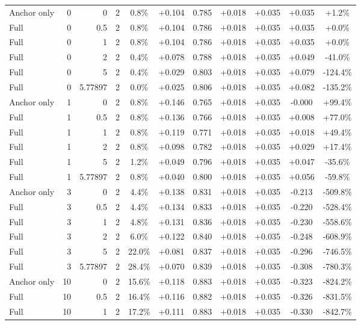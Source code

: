 \begin{table}[htbp]
\begin{tabular}{lrrrccccccc}
Anchor only & 0 & 0 & 2 & 0.8\% & +0.104 & 0.785 & +0.018 & +0.035 & +0.035 & +1.2\% \\
Full & 0 & 0.5 & 2 & 0.8\% & +0.104 & 0.786 & +0.018 & +0.035 & +0.035 & +0.0\% \\
Full & 0 & 1 & 2 & 0.8\% & +0.104 & 0.786 & +0.018 & +0.035 & +0.035 & +0.0\% \\
Full & 0 & 2 & 2 & 0.4\% & +0.078 & 0.788 & +0.018 & +0.035 & +0.049 & -41.0\% \\
Full & 0 & 5 & 2 & 0.4\% & +0.029 & 0.803 & +0.018 & +0.035 & +0.079 & -124.4\% \\
Full & 0 & 5.77897 & 2 & 0.0\% & +0.025 & 0.806 & +0.018 & +0.035 & +0.082 & -135.2\% \\
Anchor only & 1 & 0 & 2 & 0.8\% & +0.146 & 0.765 & +0.018 & +0.035 & -0.000 & +99.4\% \\
Full & 1 & 0.5 & 2 & 0.8\% & +0.136 & 0.766 & +0.018 & +0.035 & +0.008 & +77.0\% \\
Full & 1 & 1 & 2 & 0.8\% & +0.119 & 0.771 & +0.018 & +0.035 & +0.018 & +49.4\% \\
Full & 1 & 2 & 2 & 0.8\% & +0.098 & 0.782 & +0.018 & +0.035 & +0.029 & +17.4\% \\
Full & 1 & 5 & 2 & 1.2\% & +0.049 & 0.796 & +0.018 & +0.035 & +0.047 & -35.6\% \\
Full & 1 & 5.77897 & 2 & 0.8\% & +0.040 & 0.800 & +0.018 & +0.035 & +0.056 & -59.8\% \\
Anchor only & 3 & 0 & 2 & 4.4\% & +0.138 & 0.831 & +0.018 & +0.035 & -0.213 & -509.8\% \\
Full & 3 & 0.5 & 2 & 4.4\% & +0.134 & 0.833 & +0.018 & +0.035 & -0.220 & -528.4\% \\
Full & 3 & 1 & 2 & 4.8\% & +0.131 & 0.836 & +0.018 & +0.035 & -0.230 & -558.6\% \\
Full & 3 & 2 & 2 & 6.0\% & +0.122 & 0.840 & +0.018 & +0.035 & -0.248 & -608.9\% \\
Full & 3 & 5 & 2 & 22.0\% & +0.081 & 0.837 & +0.018 & +0.035 & -0.296 & -746.5\% \\
Full & 3 & 5.77897 & 2 & 28.4\% & +0.070 & 0.839 & +0.018 & +0.035 & -0.308 & -780.3\% \\
Anchor only & 10 & 0 & 2 & 15.6\% & +0.118 & 0.883 & +0.018 & +0.035 & -0.323 & -824.2\% \\
Full & 10 & 0.5 & 2 & 16.4\% & +0.116 & 0.882 & +0.018 & +0.035 & -0.326 & -831.5\% \\
Full & 10 & 1 & 2 & 17.2\% & +0.111 & 0.883 & +0.018 & +0.035 & -0.330 & -842.7\% \\

\end{tabular}
\end{table}
